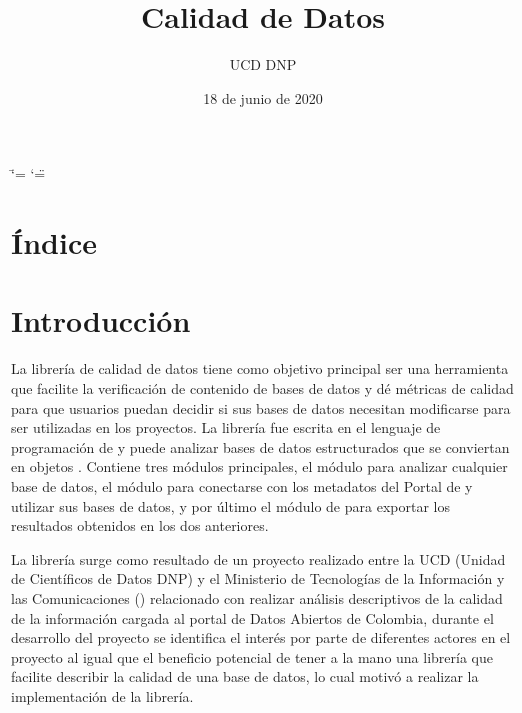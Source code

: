 \documentclass[letterpaper,10pt,openany,spanish]{sphinxmanual}
\title{Calidad de Datos}
\date{18 de junio de 2020}
\author{UCD \sphinxhyphen{} DNP}
\begin{document}
\ifdefined\shorthandoff
  \ifnum\catcode`\=\string=\active\shorthandoff{=}\fi
  \ifnum\catcode`\"=\active{}\fi
\fi

\pagestyle{empty}
\sphinxmaketitle
\pagestyle{plain}
\sphinxtableofcontents
\pagestyle{normal}
\label{\detokenize{index::doc}}



\chapter{Índice}
\label{\detokenize{genindex:indice}}\label{\detokenize{genindex:genindex}}\label{\detokenize{genindex::doc}}

\chapter{Introducción}
\label{\detokenize{introduccion:introduccion}}\label{\detokenize{introduccion::doc}}
La librería de calidad de datos tiene como objetivo principal ser una herramienta que facilite la verificación de contenido de bases de datos y dé métricas de calidad para que usuarios puedan decidir si sus bases de datos necesitan modificarse para ser utilizadas en los proyectos. La librería fue escrita en el lenguaje de programación de  y puede analizar bases de datos estructurados que se conviertan en objetos . Contiene tres módulos principales, el módulo {\hyperref[\detokenize{datos:datos}]{}} para analizar cualquier base de datos, el módulo {\hyperref[\detokenize{metadatos:metadatos}]{}} para conectarse con los metadatos del Portal de  y utilizar sus bases de datos, y por último el módulo de {\hyperref[\detokenize{reporte:reporte}]{}} para exportar los resultados obtenidos en los dos anteriores.

La librería surge como resultado de un proyecto realizado entre la UCD (Unidad de Científicos de Datos \sphinxhyphen{} DNP) y el Ministerio de Tecnologías de la Información y las Comunicaciones () relacionado con realizar análisis descriptivos de la calidad de la información cargada al portal de Datos Abiertos de Colombia, durante el desarrollo del proyecto se identifica el interés por parte de diferentes actores en el proyecto al igual que el beneficio potencial de tener a la mano una librería que facilite describir la calidad de una base de datos, lo cual motivó a realizar la implementación de la librería.
\end{document}
